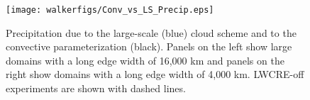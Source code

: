 \documentclass[draft]{agujournal2019}
\begin{document}
{%
\begin{figure}
  \centering
      \texttt{[image: walkerfigs/Conv\_vs\_LS\_Precip.eps]}
  \caption{Precipitation due to the large-scale (blue) cloud scheme and to the convective 
  parameterization (black).  
  Panels on the left show large domains with a long edge width of 16,000 km and
  panels on the right show domains with a long edge width of 4,000 km.  LWCRE-off experiments are shown with dashed lines.  }
  \label{fig:conv_vs_ls}
\end{figure}





}
\end{document}
